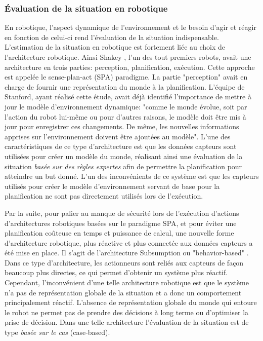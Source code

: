 \documentclass[a4paper,11pt,twoside]{StyleThese}
\begin{document}
\subsubsection{Évaluation de la situation en robotique}
En robotique, l'aspect dynamique de l'environnement et le besoin d'agir et réagir en fonction de celui-ci rend l'évaluation de la situation indispensable. L'estimation de la situation en robotique est fortement liée au choix de l'architecture robotique. Ainsi Shakey \cite{nilsson1969mobile}, l'un des tout premiers robots, avait une architecture en trois parties: perception, planification, exécution. Cette approche est appelée le sense-plan-act (SPA) paradigme.
La partie "perception" avait en charge de fournir une représentation du monde à la planification.
L'équipe de Stanford, ayant réalisé cette étude, avait déjà identifié l'importance de mettre à jour le modèle d'environnement dynamique: "comme le monde évolue, soit par l'action du robot lui-même ou pour d'autres raisons, le modèle doit être mis à jour pour enregistrer ces changements. De même, les nouvelles informations apprises sur l'environnement doivent être ajoutées au modèle".
L'une des caractéristiques de ce type d'architecture est que les données capteurs sont utilisées pour créer un modèle du monde, réalisant ainsi une évaluation de la situation \textit{basée sur des règles expertes} afin de permettre la planification pour atteindre un but donné. L'un des inconvénients de ce système est que les capteurs utilisés pour créer le modèle d'environnement servant de base pour la planification ne sont pas directement utilisés lors de l'exécution.

Par la suite, pour palier au manque de sécurité lors de l'exécution d'actions d'architectures robotiques basées sur le paradigme SPA, et pour éviter une planification coûteuse en temps et puissance de calcul,
une nouvelle forme d'architecture robotique, plus réactive et plus connectée aux données capteurs a été mise en place. Il s'agit de l'architecture Subsumption ou "behavior-based" \cite{brooks1986robust}. Dans ce type d'architecture, les actionneurs sont reliés aux capteurs de façon beaucoup plus directes, ce qui permet d'obtenir un système plus réactif. Cependant, l'inconvénient d'une telle architecture robotique est que le système n'a pas de représentation globale de la situation et a donc un comportement principalement réactif. L'absence de représentation globale du monde qui entoure le robot ne permet pas de prendre des décisions à long terme ou d'optimiser la prise de décision. Dans une telle architecture l'évaluation de la situation est de type \textit{basée sur le cas} (case-based).
\end{document}
